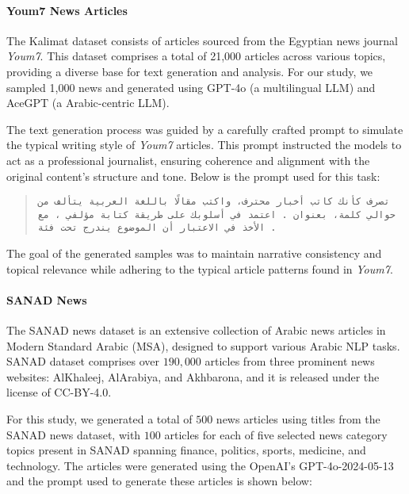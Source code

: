 \paragraph{Youm7 News Articles}
The Kalimat dataset consists of articles sourced from the Egyptian news journal \textit{Youm7}. This dataset comprises a total of 21,000 articles across various topics, providing a diverse base for text generation and analysis. For our study, we sampled 1,000 news and generated using GPT-4o (a multilingual LLM) and AceGPT (a Arabic-centric LLM). 

The text generation process was guided by a carefully crafted prompt to simulate the typical writing style of \textit{Youm7} articles. This prompt instructed the models to act as a professional journalist, ensuring coherence and alignment with the original content’s structure and tone. Below is the prompt used for this task:
\begin{quote}
    \small
    \begin{RLtext}
        \texttt{تصرف كأنك كاتب أخبار محترف، واكتب مقالًا باللغة العربية يتألف من حوالي  كلمة، بعنوان . اعتمد في أسلوبك على طريقة كتابة مؤلفي ، مع الأخذ في الاعتبار أن الموضوع يندرج تحت فئة .}
    \end{RLtext}
\end{quote}

The goal of the generated samples was to maintain narrative consistency and topical relevance while adhering to the typical article patterns found in \textit{Youm7}. 


\paragraph{SANAD News}
\label{sanad_before_prompt_eng}
The SANAD news dataset \cite{EINEA2019104076} is an extensive collection of Arabic news articles in Modern Standard Arabic (MSA), designed to support various Arabic NLP tasks. SANAD dataset comprises over $190,000$ articles from three prominent news websites: AlKhaleej, AlArabiya, and Akhbarona, and it is released under the license of CC-BY-4.0.

For this study, we generated a total of $500$ news articles using titles from the SANAD news dataset, with $100$ articles for each of five selected news category topics present in SANAD spanning finance, politics, sports, medicine, and technology. The articles were generated using the OpenAI's GPT-4o-2024-05-13 and the prompt used to generate these articles is shown below:

